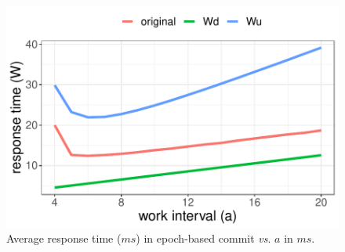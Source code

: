 \begin{figure}[htbp]
\begin{minipage}{.35\textwidth}
  \centering
  \includegraphics[width=0.8\linewidth]{figures/fig-5.pdf}
  \caption{Average response time ($ms$) in epoch-based commit \textit{vs}. $a$ in $ms$.
  }
  \label{fig:5}
\end{minipage}
\end{figure}

